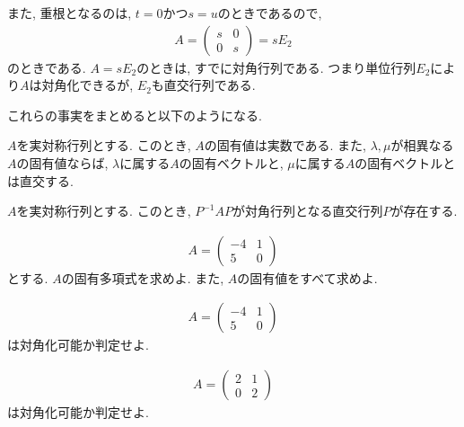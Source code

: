 また,
重根となるのは,
$t=0$かつ$s=u$のときであるので,
\begin{align*}
  A=\begin{pmatrix}s&0\\0&s\end{pmatrix}=sE_2
\end{align*}
のときである.
$A=sE_2$のときは,
すでに対角行列である.
つまり単位行列$E_2$により$A$は対角化できるが,
$E_2$も直交行列である.

これらの事実をまとめると以下のようになる.
\begin{theorem}
  \label{thm:symmat:eigen}
  $A$を実対称行列とする.
  このとき, $A$の固有値は実数である.
  また, $\lambda,\mu$が相異なる$A$の固有値ならば,
  $\lambda$に属する$A$の固有ベクトルと,
  $\mu$に属する$A$の固有ベクトルとは直交する.
\end{theorem}
\begin{theorem}
  \label{thm:symmat:diag}
  $A$を実対称行列とする.
  このとき, $P^{-1}AP$が対角行列となる直交行列$P$が存在する.
\end{theorem}


\begin{quiz}
  \label{quiz:6:1}
  \begin{align*}
    A=\begin{pmatrix}-4&1\\5&0\end{pmatrix}
  \end{align*}
  とする.
  $A$の固有多項式を求めよ. また, $A$の固有値をすべて求めよ.
\end{quiz}

\begin{quiz}
  \label{quiz:6:2}
  \begin{align*}
    A=\begin{pmatrix}-4&1\\5&0\end{pmatrix}
  \end{align*}
  は対角化可能か判定せよ.
\end{quiz}

\begin{quiz}
  \label{quiz:6:3}
  \begin{align*}
    A=\begin{pmatrix}2&1\\0&2\end{pmatrix}
  \end{align*}
  は対角化可能か判定せよ.
\end{quiz}

